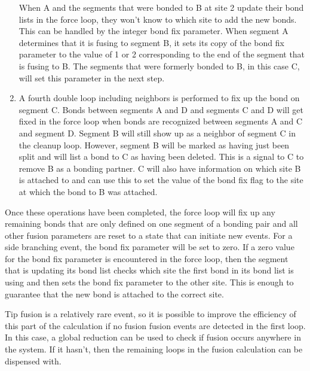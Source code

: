 \documentclass[12pt]{article}
\begin{document}
\begin{enumerate}
When A and the
segments that were bonded to B at site 2 update their bond lists in the force loop, they
won't know to which site to add the new bonds. This can be handled by the integer bond fix
parameter. When segment A determines that it is fusing to segment B, it sets its copy of the
bond fix parameter to the value of 1 or 2 corresponding to the end of the segment that is
fusing to B. The segments that were formerly bonded to B, in this case C, will set this
parameter in the next step.

\item A fourth double loop including neighbors is performed to fix up the bond on segment C.
Bonds between segments A and D and segments C and D will get fixed in the force loop when
bonds are recognized between segments A and C and segment D. Segment B will still show up as
a neighbor of
segment C in the cleanup loop. However, segment B will be marked as having just been split and
will list a
bond to C as having been deleted. This is a signal to C to remove B as a bonding partner. C
will also have information on which site B is attached to and can use this to set the value of
the bond fix flag to the site at which the bond to B was attached.
\end{enumerate}
Once these operations have been completed, the force loop will fix up any remaining
bonds that are only defined on one segment of a bonding pair and all other fusion parameters are
reset to a state that can initiate new events. For a side branching event, the bond fix parameter
will be set to zero. If a zero value for the bond fix parameter is encountered in the force loop,
then the segment that is
updating its bond list checks which site the first bond in its bond list is using and then sets
the bond fix parameter to the other site. This is enough to guarantee that the new bond is
attached to the correct site.

Tip fusion is a relatively rare event, so it is possible to improve the
efficiency of this part of the calculation if no fusion fusion events are
detected in the first loop. In this case, a global reduction can be used to
check if fusion occurs anywhere in the system. If it hasn't, then the remaining
loops in the fusion calculation can be dispensed with.
\end{document}
